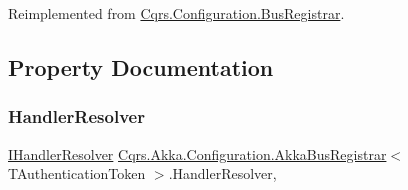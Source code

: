 Reimplemented from \hyperlink{classCqrs_1_1Configuration_1_1BusRegistrar_a3103da4cf077104607fe03a862958827_a3103da4cf077104607fe03a862958827}{Cqrs.\+Configuration.\+Bus\+Registrar}.



\subsection{Property Documentation}
\mbox{\label{classCqrs_1_1Akka_1_1Configuration_1_1AkkaBusRegistrar_a642cd7215c2f51cfaff263f9ba95a4c4_a642cd7215c2f51cfaff263f9ba95a4c4}} 
\subsubsection{\texorpdfstring{Handler\+Resolver}{HandlerResolver}}
{\footnotesize\ttfamily \hyperlink{interfaceCqrs_1_1Akka_1_1Configuration_1_1IHandlerResolver}{I\+Handler\+Resolver} \hyperlink{classCqrs_1_1Akka_1_1Configuration_1_1AkkaBusRegistrar}{Cqrs.\+Akka.\+Configuration.\+Akka\+Bus\+Registrar}$<$ T\+Authentication\+Token $>$.Handler\+Resolver\hspace{0.3cm}{\ttfamily [get]}, {\ttfamily [protected]}}

